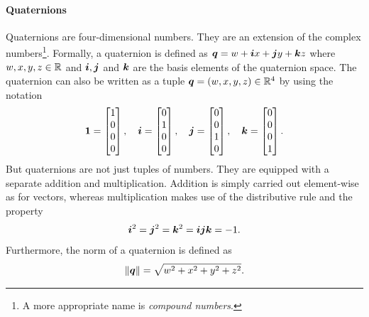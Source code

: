 		\paragraph{Quaternions}
		Quaternions are four-dimensional numbers.
		They are an extension of the complex numbers\footnote{A more appropriate name is \emph{compound numbers}.}.
		Formally, a quaternion is defined as $\bm{q} = w + \bm{i}x + \bm{j}y + \bm{k}z$ where $w, x, y, z \in \mathbb{R}$ and $\bm{i},\bm{j}$ and $\bm{k}$ are the basis elements of the quaternion space.
		The quaternion can also be written as a tuple $\bm{q} = (w, x, y, z) \in \mathbb{R}^4$ by using the notation
		\begin{equation}
			\bm{1} = 
			\begin{bmatrix}
				1 \\ 
				0 \\ 
				0 \\ 
				0
			\end{bmatrix},\quad
			\bm{i} = 
			\begin{bmatrix}
				0 \\ 
				1 \\ 
				0 \\ 
				0
			\end{bmatrix},\quad
			\bm{j} = 
			\begin{bmatrix}
				0 \\ 
				0 \\ 
				1 \\ 
				0
			\end{bmatrix},\quad
			\bm{k} =
			\begin{bmatrix}
				0 \\ 
				0 \\ 
				0 \\ 
				1
			\end{bmatrix}.
		\end{equation}
		But quaternions are not just tuples of numbers. 
		They are equipped with a separate addition and multiplication.
		Addition is simply carried out element-wise as for vectors, whereas multiplication makes use of the distributive rule and the property
		\begin{equation}
			\bm{i}^2 = \bm{j}^2 = \bm{k}^2 = \bm{i}\bm{j}\bm{k} = -1.
		\end{equation}
		Furthermore, the norm of a quaternion is defined as
		\begin{equation}
			\lVert \bm{q} \rVert = \sqrt{w^2 + x^2 + y^2 + z^2}.
		\end{equation}
		

